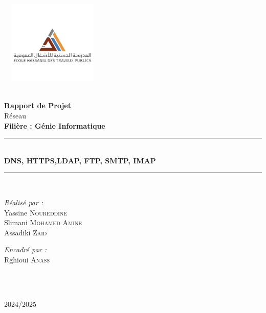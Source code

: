 


	\begin{titlepage}
		\begin{center}
		
			\begin{minipage}{4.5cm}
				\begin{center}
					\includegraphics[width=5cm,height=4cm]{ehtp.png}
				\end{center}
			\end{minipage}
			
			\textsc{\Large }\\[1.5cm]
			{\large \bfseries Rapport de Projet}\\[0.5cm]
			{\large Réseau}\\[1cm]
			
			{\large \bfseries Filière : Génie Informatique}\\[1cm]
			
			\rule{\linewidth}{0.3mm} \\[0.4cm]
			{ \huge \bfseries\color{blue!70!black}DNS, HTTPS,LDAP, FTP, SMTP, IMAP \\[0.4cm] }
			\rule{\linewidth}{0.3mm} \\[1cm]
			
			\noindent
			\begin{minipage}{0.4\textwidth}
				\begin{flushleft} \large
					\emph{\color{orange!80!black}Réalisé par :}\\
					Yassine \textsc{Noureddine}\\
					Slimani \textsc{Mohamed Amine}\\
					Assadiki \textsc{ Zaid}\\
				\end{flushleft}
			\end{minipage}%
			\begin{minipage}{0.5\textwidth}
				\begin{flushright} \large
					\emph{\color{orange!80!black}Encadré par :} \\
					Rghioui \textsc{Anass}
				\end{flushright}
			\end{minipage}\\[1cm]
			
			\vfill
			
			{\large \color{orange!80!black}{Année universitaire}\\ \color{blue!80!black}2024/2025}
			
		\end{center}
	\end{titlepage}
	
